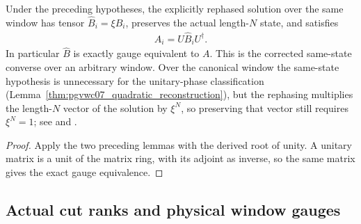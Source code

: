 \begin{lemma}
    \label{lem:quadratic_same_state_exact_rephased_solution}
    \leanok
    Under the preceding hypotheses, the explicitly rephased solution
    over the same window has tensor $\widehat B_i=\xi B_i$, preserves
    the actual length-$N$ state, and satisfies
    \begin{align}
        A_i=U\widehat B_iU^\dagger.
    \end{align}
    In particular $\widehat B$ is exactly gauge equivalent to $A$.
    This is the corrected same-state converse over an arbitrary window.
    Over the canonical window the same-state hypothesis is unnecessary
    for the unitary-phase classification
    (Lemma~\ref{thm:pgvwc07_quadratic_reconstruction}), but the rephasing
    multiplies the length-$N$ vector of the solution by $\xi^N$, so
    preserving that vector still requires $\xi^N=1$;
    see \cite{gap:pgvwc07_quadratic_reconstruction_phase} and
    \cite{gap:pgvwc07_intertwiner_chain_off_by_one}.
\end{lemma}
\begin{proof}
    \leanok
    Apply the two preceding lemmas with the derived root of unity.
    A unitary matrix is a unit of the matrix ring, with its adjoint
    as inverse, so the same matrix gives the exact gauge equivalence.
\end{proof}

\subsection{Actual cut ranks and physical window gauges}
\label{sec:quadratic_physical_cut_window}

